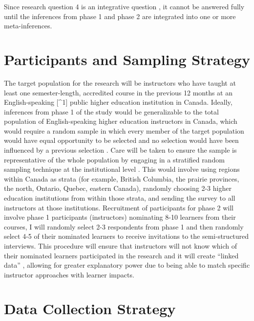 \documentclass[
]{book}
\begin{document}
Since research question 4 is an integrative question \citep{creamerIntroductionFullyIntegrated2018}, it cannot be answered fully until the inferences from phase 1 and phase 2 are integrated into one or more meta-inferences.

\hypertarget{participants-and-sampling-strategy}{%
\section*{Participants and Sampling Strategy}\label{participants-and-sampling-strategy}}

The target population for the research will be instructors who have taught at least one semester-length, accredited course in the previous 12 months at an English-speaking {[}\^{}1{]} public higher education institution in Canada. Ideally, inferences from phase 1 of the study would be generalizable to the total population of English-speaking higher education instructors in Canada, which would require a random sample in which every member of the target population would have equal opportunity to be selected and no selection would have been influenced by a previous selection \citep{hibbertsCommonSurveySampling2012, rencklyAirUniversitySampling2002}. Care will be taken to ensure the sample is representative of the whole population by engaging in a stratified random sampling technique at the institutional level \citep{hibbertsCommonSurveySampling2012}. This would involve using regions within Canada as strata (for example, British Columbia, the prairie provinces, the north, Ontario, Quebec, eastern Canada), randomly choosing 2-3 higher education institutions from within those strata, and sending the survey to all instructors at those institutions. Recruitment of participants for phase 2 will involve phase 1 participants (instructors) nominating 8-10 learners from their courses, I will randomly select 2-3 respondents from phase 1 and then randomly select 4-5 of their nominated learners to receive invitations to the semi-structured interviews. This procedure will ensure that instructors will not know which of their nominated learners participated in the research and it will create ``linked data'' \citeyearpar[p.~126]{bazeleyIntegratingAnalysesMixed2018}, allowing for greater explanatory power due to being able to match specific instructor approaches with learner impacts.

\hypertarget{data-collection-strategy}{%
\section*{Data Collection Strategy}\label{data-collection-strategy}}
\end{document}
